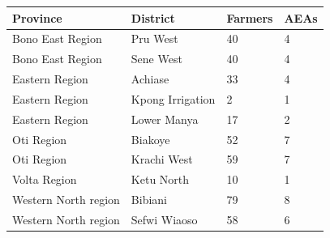 \begin{tabular}{llll}
\hline Province & District & Farmers & AEAs \\ \hline
Bono East Region&Pru West&40&4\\
Bono East Region&Sene West&40&4\\
Eastern Region&Achiase&33&4\\
Eastern Region&Kpong Irrigation&2&1\\
Eastern Region&Lower Manya&17&2\\
Oti Region&Biakoye&52&7\\
Oti Region&Krachi West&59&7\\
Volta Region&Ketu North&10&1\\
Western North region&Bibiani&79&8\\
Western North region&Sefwi Wiaoso&58&6\\
\hline
\end{tabular}
